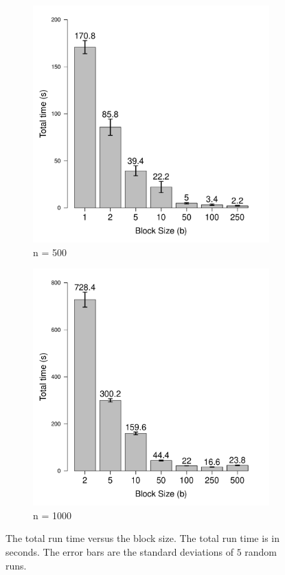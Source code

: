 \documentclass{article} %
\begin{document}
\begin{figure}[ht]
\centering
\begin{subfigure}[b]{0.45\textwidth}
\includegraphics[width = \textwidth]{time.pdf}
\caption{n = 500}
\end{subfigure}
\begin{subfigure}[b]{0.45\textwidth}
\includegraphics[width = \textwidth]{time1000.pdf}
\caption{n = 1000}
\end{subfigure}
\caption{The total run time versus the block size. The total run time is in seconds. The error bars are the standard deviations of $5$ random runs.}
\label{fig:time-result}
\end{figure}
\end{document}
